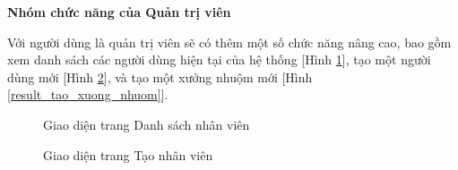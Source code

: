 \textbf{Nhóm chức năng của Quản trị viên}

Với người dùng là quản trị viên sẽ có thêm một số chức năng nâng cao, bao gồm xem danh sách các người dùng hiện tại của hệ thống [Hình \ref{result_danh_sach_nhan_vien}], tạo một người dùng mới [Hình \ref{result_tao_nhan_vien}], và tạo một xưởng nhuộm mới [Hình \ref{result_tao_xuong_nhuom}].

\begin{figure}[H]
    \begin{center}
        \caption{Giao diện trang Danh sách nhân viên}
        \label{result_danh_sach_nhan_vien}
    \end{center}
\end{figure}

\begin{figure}[H]
    \begin{center}
        \caption{Giao diện trang Tạo nhân viên}
        \label{result_tao_nhan_vien}
    \end{center}
\end{figure}

